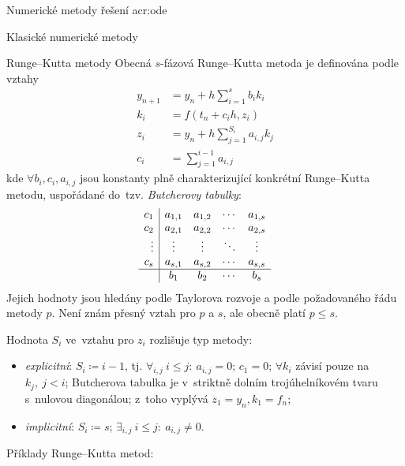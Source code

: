 \documentclass[thesis=M,czech]{FITthesis}[2012/06/26]
\newcommand{\acrlabel}[1]{acr:#1}
\newcommand{\acr}[1]{\acrshort{\acrlabel{#1}}}
\newcommand{\hl}[1]{\textit{#1}}
\newcommand{\name}[1]{\hl{#1}}
\newcommand{\cit}[1]{\cite{#1}}
\begin{document}
\begin{section}{Numerické metody řešení \acr{ode}}
\begin{subsection}{Klasické numerické metody}
\begin{subsubsection}{Runge--Kutta metody}
Obecná $s$-fázová Runge--Kutta metoda je definována
podle~\cit{ode-nsolve-book}\cit{ode-valid-runge_kutta-art} vztahy
\begin{equation}\label{eq:ode:rk}
\begin{split}
   y_{n+1} &= y_{n} + h \sum_{i=1}^{s} b_{i} k_{i} \\
   k_{i}   &= f \! \left( t_{n} + c_{i} h, z_{i} \right) \\
   z_{i}   &= y_{n} + h \sum_{j=1}^{S_{i}} a_{i,j} k_{j} \\
   c_{i}   &= \sum_{j=1}^{i-1} a_{i,j}
\end{split}
\end{equation}
kde ${\forall b_{i}}, c_{i}, a_{i,j}$ jsou konstanty
plně charakterizující konkrétní Runge--Kutta metodu,
uspořádané do~tzv. \name{Butcherovy tabulky}:
\begin{equation}\label{eq:ode:rk:tab}
\begin{array}{r|cccc}
   c_{1}  & a_{1,1} & a_{1,2} & \cdots & a_{1,s} \\
   c_{2}  & a_{2,1} & a_{2,2} & \cdots & a_{2,s} \\
   \vdots & \vdots  & \vdots  & \ddots & \vdots  \\
   c_{s}  & a_{s,1} & a_{s,2} & \cdots & a_{s,s} \\ \hline
          & b_{1}   & b_{2}   & \cdots & b_{s}
\end{array}
\end{equation}
Jejich hodnoty jsou hledány podle Taylorova rozvoje
a podle požadovaného řádu metody $p$.
Není znám přesný vztah pro $p$ a $s$,
ale obecně platí ${p \leq s}$.

Hodnota $S_{i}$ ve~vztahu pro $z_{i}$ rozlišuje typ metody:
\begin{itemize}
\item \hl{explicitní}: ${S_{i} \coloneqq i-1}$,
   tj. ${\forall_{i,j} \: i \leq j : \: a_{i,j} = 0}$;
   ${c_{1} = 0}$;
   ${\forall k_{i}}$ závisí pouze na ${k_{j}, \: j < i}$;
   Butcherova tabulka je v~striktně dolním trojúhelníkovém tvaru
   s~nulovou diagonálou;
   z~toho vyplývá ${z_{1} = y_{n}}, {k_{1} = f_{n}}$;
\item \hl{implicitní}: ${S_{i} \coloneqq s}$;
   ${\exists_{i,j} \: i \leq j : \: a_{i,j} \neq 0}$.
\end{itemize}

Příklady Runge--Kutta metod:



\end{subsubsection}
\end{subsection}
\end{section}
\end{document}
